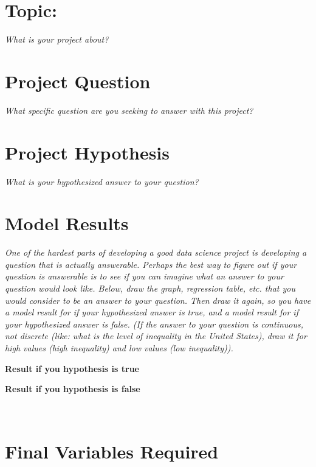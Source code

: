 \documentclass[12pt]{article}
\begin{document}
\section{Topic:}
\emph{What is your project about?}
\vspace*{1cm}\\

\section{Project Question}
\emph{What specific question are you seeking to answer with this project?}
\vspace*{1cm}\\

\section{Project Hypothesis}
\emph{What is your hypothesized answer to your question?}
\vspace*{1cm}\\

\section{Model Results}
\emph{One of the hardest parts of developing a good data science project is developing a question that is actually answerable. Perhaps the best way to figure out if your question is answerable is to see if you can imagine what an answer to your question would look like. Below, draw the graph, regression table, etc. that you would consider to be an answer to your question. Then draw it again, so you have a model result for if your hypothesized answer is true, and a model result for if your hypothesized answer is false. (If the answer to your question is continuous, not discrete (like: what is the level of inequality in the United States), draw it for high values (high inequality) and low values (low inequality)).}

\begin{minipage}{0.5\textwidth}
\centering
\textbf{Result if you hypothesis is true}
\end{minipage}
\begin{minipage}{0.5\textwidth}
\centering
\textbf{Result if you hypothesis is false}
\end{minipage}
\vspace*{5cm}\\

\section{Final Variables Required}
\end{document}
